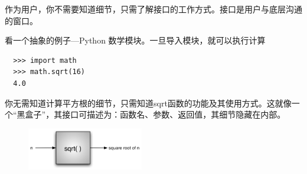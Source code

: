 \begin{frame}[fragile]\ft{\secname}

  作为用户，你不需要知道细节，只需了解接口的工作方式。接口是用户与底层沟通的窗口。

\end{frame}

\begin{frame}[fragile]\ft{\secname}

  看一个抽象的例子---Python 数学模块。一旦导入模块，就可以执行计算
\begin{lstlisting}
  >>> import math
  >>> math.sqrt(16)
  4.0
\end{lstlisting} \pause 

你无需知道计算平方根的细节，只需知道sqrt函数的功能及其使用方式。这就像一个“黑盒子”，其接口可描述为：函数名、参数、返回值，其细节隐藏在内部。
\begin{figure}[htbp]
  \centering
  \includegraphics[width=2in]{images/blackbox.png}
\end{figure}

\end{frame}

